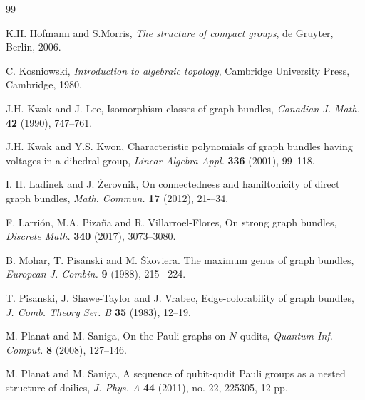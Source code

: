 \documentclass{amsart}
\theoremstyle{definition}
\numberwithin{equation}{section}
\begin{document}
\begin{thebibliography}{99}



 K.H. Hofmann and S.Morris, \textit{The structure of compact groups}, de Gruyter, Berlin, 2006.







 C. Kosniowski, \textit{Introduction to algebraic topology}, Cambridge University Press,  Cambridge, 1980.


 J.H. Kwak and J. Lee, Isomorphism classes of graph bundles, \textit{Canadian J.  Math.} \textbf{42} (1990), 747--761.

 J.H. Kwak and Y.S. Kwon, Characteristic polynomials of graph bundles having voltages in a dihedral group, \textit{Linear Algebra Appl.}  \textbf{336}  (2001),  99--118.

 I. H. Ladinek and J. Žerovnik, On connectedness and hamiltonicity of direct graph bundles,  \textit{Math. Commun.} \textbf{17} (2012), 21-–34.


 F. Larri\'on, M.A. Piza\~na and R. Villarroel-Flores, On strong graph bundles, \textit{Discrete Math.} \textbf{340} (2017),  3073--3080.


 B. Mohar, T. Pisanski and M. Škoviera. The maximum genus of graph bundles,  \textit{European J. Combin.} \textbf{9} (1988),  215-–224.



 T. Pisanski, J. Shawe-Taylor and  J. Vrabec, Edge-colorability of graph bundles, \textit{J. Comb. Theory Ser. B} \textbf{35} (1983), 12--19.

 M. Planat and M. Saniga, On the Pauli graphs on $N$-qudits, \emph{Quantum Inf. Comput.} {\bf 8} (2008),  127--146.


 M. Planat and M. Saniga, A sequence of qubit-qudit Pauli groups as a nested structure of doilies, \emph{J. Phys. A} {\bf 44} (2011), no. 22, 225305, 12 pp.



\end{thebibliography}
\end{document}
